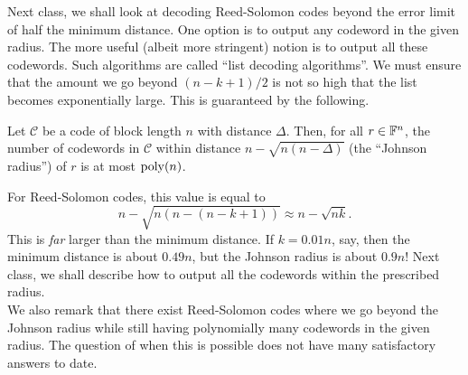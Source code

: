 			Next class, we shall look at decoding Reed-Solomon codes beyond the error limit of half the minimum distance. One option is to output any codeword in the given radius. The more useful (albeit more stringent) notion is to output all these codewords. Such algorithms are called ``list decoding algorithms''.
			We must ensure that the amount we go beyond $(n-k+1)/2$ is not so high that the list becomes exponentially large. This is guaranteed by the following.

			\begin{ftheo}[Johnson] %
				Let $\mathcal{C}$ be a code of block length $n$ with distance $\Delta$. Then, for all $r \in \mathbb{F}^n$, the number of codewords in $\mathcal{C}$ within distance $n - \sqrt{n(n-\Delta)}$ (the ``Johnson radius'') of $r$ is at most $\operatorname{poly}(n)$.
			\end{ftheo}

			For Reed-Solomon codes, this value is equal to
			\[ n - \sqrt{n\left( n - (n-k+1) \right)} \approx n-\sqrt{nk}. \]
			This is \emph{far} larger than the minimum distance. If $k = 0.01n$, say, then the minimum distance is about $0.49n$, but the Johnson radius is about $0.9n$! Next class, we shall describe how to output all the codewords within the prescribed radius.\\
			We also remark that there exist Reed-Solomon codes where we go beyond the Johnson radius while still having polynomially many codewords in the given radius. The question of when this is possible does not have many satisfactory answers to date.